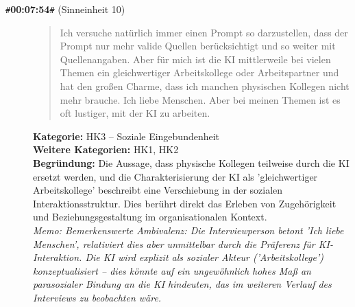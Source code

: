 \begin{description}
  \item[\texttt{\#}\textbf{00:07:54}\texttt{\#} (Sinneinheit 10)]
  \begin{quote}
  Ich versuche natürlich immer einen Prompt so darzustellen, dass der Prompt nur mehr valide Quellen berücksichtigt und so weiter mit Quellenangaben. Aber für mich ist die KI mittlerweile bei vielen Themen ein gleichwertiger Arbeitskollege oder Arbeitspartner und hat den großen Charme, dass ich manchen physischen Kollegen nicht mehr brauche. Ich liebe Menschen. Aber bei meinen Themen ist es oft lustiger, mit der KI zu arbeiten.
  \end{quote}
  \textbf{Kategorie:} HK3 -- Soziale Eingebundenheit\\
  \textbf{Weitere Kategorien:} HK1, HK2\\
  \textbf{Begr\"undung:} Die Aussage, dass physische Kollegen teilweise durch die KI ersetzt werden, und die Charakterisierung der KI als 'gleichwertiger Arbeitskollege' beschreibt eine Verschiebung in der sozialen Interaktionsstruktur. Dies berührt direkt das Erleben von Zugehörigkeit und Beziehungsgestaltung im organisationalen Kontext.
  \\\textit{Memo: Bemerkenswerte Ambivalenz: Die Interviewperson betont 'Ich liebe Menschen', relativiert dies aber unmittelbar durch die Präferenz für KI-Interaktion. Die KI wird explizit als sozialer Akteur ('Arbeitskollege') konzeptualisiert – dies könnte auf ein ungewöhnlich hohes Maß an parasozialer Bindung an die KI hindeuten, das im weiteren Verlauf des Interviews zu beobachten wäre.}
\end{description}
\medskip

